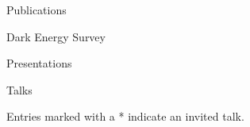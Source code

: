 \documentclass{resume} %
\begin{document}
\begin{rSection}{Publications}
\begin{rSubsection}{Dark Energy Survey}{}{}{}
\begin{enumerate}
        \end{enumerate}
            
    \end{rSubsection}    

            
            
\begin{rSection}{Presentations}

\begin{rSubsection}{Talks}{}{}{}

Entries marked with a * indicate an invited talk.


\end{rSubsection}
\end{rSection}
\end{rSection}
\end{document}
